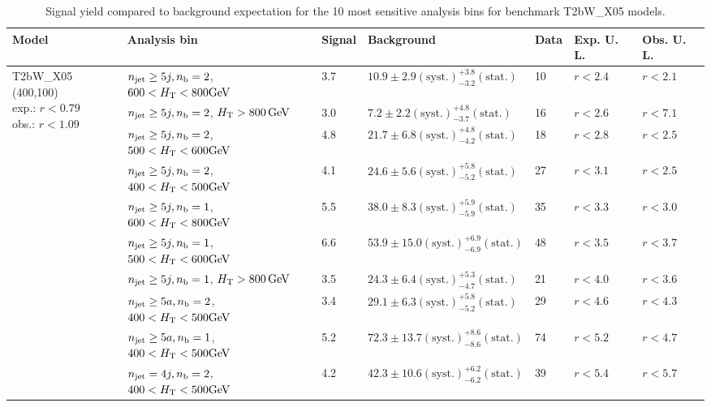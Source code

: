 \begin{table}[h!] 
  \scriptsize
  \caption{ 
Signal yield compared to background expectation for the 10 most sensitive analysis bins 
for benchmark T2bW\_X05 models.
  \label{tab:sigBenchmarksYields_T2bW_X05}}
  \centering 
  \begin{tabular}{ lllllll } 
    \hline 
    \hline 
    Model & Analysis bin & Signal & Background & Data & Exp. U. L. & Obs. U. L. \\ \hline
\multirow{10}{*}{\parbox[t]{2cm}{T2bW\_X05 (400,100)\\exp.: $r<0.79$\\obs.: $r<1.09$}}
 & $n_{\mathrm{jet}} \geq5j,n_{\text{b}} =2$, $600 < \mbox{$H_\text{T}$} < 800 \mathrm{GeV}$ & 3.7 & $10.9 \pm 2.9 \mathrm{(syst.)} ^{+3.8}_{-3.2} \mathrm{(stat.)}$ & 10 & $r < 2.4$ & $r < 2.1$\\ 
 & $n_{\mathrm{jet}} \geq5j,n_{\text{b}} =2$, $\mbox{$H_\text{T}$} > 800 \, \mathrm{GeV}$ & 3.0 & $7.2 \pm 2.2 \mathrm{(syst.)} ^{+4.8}_{-3.7} \mathrm{(stat.)}$ & 16 & $r < 2.6$ & $r < 7.1$\\ 
 & $n_{\mathrm{jet}} \geq5j,n_{\text{b}} =2$, $500 < \mbox{$H_\text{T}$} < 600 \mathrm{GeV}$ & 4.8 & $21.7 \pm 6.8 \mathrm{(syst.)} ^{+4.8}_{-4.2} \mathrm{(stat.)}$ & 18 & $r < 2.8$ & $r < 2.5$\\ 
 & $n_{\mathrm{jet}} \geq5j,n_{\text{b}} =2$, $400 < \mbox{$H_\text{T}$} < 500 \mathrm{GeV}$ & 4.1 & $24.6 \pm 5.6 \mathrm{(syst.)} ^{+5.8}_{-5.2} \mathrm{(stat.)}$ & 27 & $r < 3.1$ & $r < 2.5$\\ 
 & $n_{\mathrm{jet}} \geq5j,n_{\text{b}} =1$, $600 < \mbox{$H_\text{T}$} < 800 \mathrm{GeV}$ & 5.5 & $38.0 \pm 8.3 \mathrm{(syst.)} ^{+5.9}_{-5.9} \mathrm{(stat.)}$ & 35 & $r < 3.3$ & $r < 3.0$\\ 
 & $n_{\mathrm{jet}} \geq5j,n_{\text{b}} =1$, $500 < \mbox{$H_\text{T}$} < 600 \mathrm{GeV}$ & 6.6 & $53.9 \pm 15.0 \mathrm{(syst.)} ^{+6.9}_{-6.9} \mathrm{(stat.)}$ & 48 & $r < 3.5$ & $r < 3.7$\\ 
 & $n_{\mathrm{jet}} \geq5j,n_{\text{b}} =1$, $\mbox{$H_\text{T}$} > 800 \, \mathrm{GeV}$ & 3.5 & $24.3 \pm 6.4 \mathrm{(syst.)} ^{+5.3}_{-4.7} \mathrm{(stat.)}$ & 21 & $r < 4.0$ & $r < 3.6$\\ 
 & $n_{\mathrm{jet}} \geq5a,n_{\text{b}} =2$, $400 < \mbox{$H_\text{T}$} < 500 \mathrm{GeV}$ & 3.4 & $29.1 \pm 6.3 \mathrm{(syst.)} ^{+5.8}_{-5.2} \mathrm{(stat.)}$ & 29 & $r < 4.6$ & $r < 4.3$\\ 
 & $n_{\mathrm{jet}} \geq5a,n_{\text{b}} =1$, $400 < \mbox{$H_\text{T}$} < 500 \mathrm{GeV}$ & 5.2 & $72.3 \pm 13.7 \mathrm{(syst.)} ^{+8.6}_{-8.6} \mathrm{(stat.)}$ & 74 & $r < 5.2$ & $r < 4.7$\\ 
 & $n_{\mathrm{jet}} =4j,n_{\text{b}} =2$, $400 < \mbox{$H_\text{T}$} < 500 \mathrm{GeV}$ & 4.2 & $42.3 \pm 10.6 \mathrm{(syst.)} ^{+6.2}_{-6.2} \mathrm{(stat.)}$ & 39 & $r < 5.4$ & $r < 5.7$\\ \hline

\end{tabular}
\end{table}
